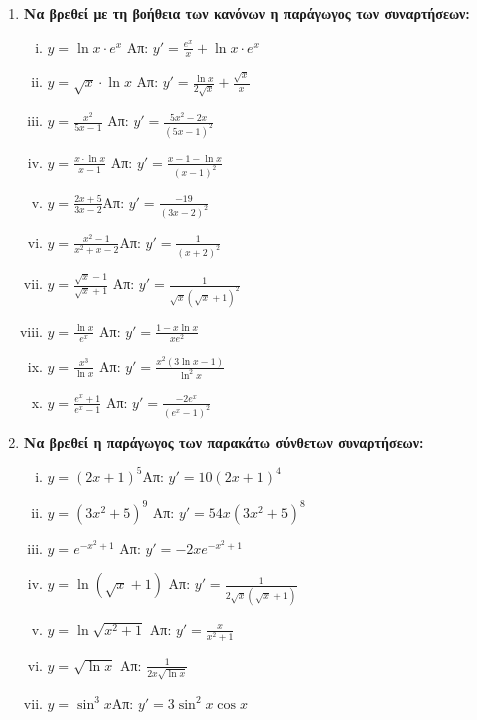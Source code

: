 \begin{enumerate}
  \item {\bfseries Να βρεθεί με τη βοήθεια των κανόνων η παράγωγος των συναρτήσεων:}
    \begin{enumerate}[i)]
      \item $ y= \ln{x} \cdot e^{x} $ 
        \hfill Απ: $ y'= \frac{e^{x}}{x} + \ln{x}\cdot e^{x} $ 
      \item $ y= \sqrt{x}\cdot \ln{x} $ 
        \hfill Απ: $ y'= \frac{\ln{x}}{2 \sqrt{ x }}  + \frac{\sqrt{ x }}{x} $ 
      \item $ y= \frac{x^{2}}{5x-1} $ \hfill Απ: $ y'= \frac{5x^{2}-2x}{(5x-1)^{2}} $  
      \item $ y = \frac{x\cdot \ln{x}}{x-1} $ 
        \hfill Απ: $ y' = \frac{x-1- \ln{x}}{(x-1)^{2}} $ 
      \item $y=\frac{2x+5}{3x-2}$\hfill Απ: $y'=\frac{-19}{(3x-2)^2}$
      \item $y=\frac{x^2-1}{x^2+x-2}$\hfill Απ: $y'=\frac{1}{(x+2)^2}$
      \item $y=\frac{\sqrt{x}-1}{\sqrt{x}+1}$
        \hfill Απ: $y'=\frac{1}{\sqrt{x}(\sqrt{x}+1)^2}$
      \item $ y= \frac{\ln{x}}{e^{x}} $ \hfill Απ: $ y'= \frac{1 - x \ln{x}}{xe^{2}} $ 
      \item $ y= \frac{x^{3}}{\ln{x}} $ 
        \hfill Απ: $ y' = \frac{x^{2}(3 \ln{x} -1)}{\ln^{2}{x} } $ 
      \item $ y= \frac{e^{x}+1}{e^{x}-1} $ 
        \hfill Απ: $ y'= \frac{-2e^{x}}{(e^{x}-1)^{2}} $ 
    \end{enumerate}

  \item {\bfseries Να βρεθεί η παράγωγος των παρακάτω σύνθετων συναρτήσεων:}
    \begin{enumerate}[i)]
      \item $y=(2x+1)^5$\hfill Απ: $y'=10(2x+1)^4$
      \item $ y=(3x^{2}+5)^{9} $ \hfill Απ: $ y'=54x(3x^{2}+5)^{8} $ 
      \item $ y=e^{-x^{2}+1} $ \hfill Απ: $ y'=-2x e^{-x^{2}+1} $ 
      \item $ y= \ln{(\sqrt{ x } +1)} $ 
        \hfill Απ: $ y'= \frac{1}{2 \sqrt{ x } (\sqrt{ x } +1)} $ 
      \item $y= \ln{\sqrt{x^{2}+1}} $ \hfill Απ: $ y'= \frac{x}{x^{2}+1} $ 
      \item $ y= \sqrt{ \ln{x} } $ \hfill Απ: $ \frac{1}{2x \sqrt{ \ln{x} }} $ 
      \item $y=\sin^3 x$\hfill Απ: $y'=3\sin^2x \cos x$
    \end{enumerate}
\end{enumerate}






